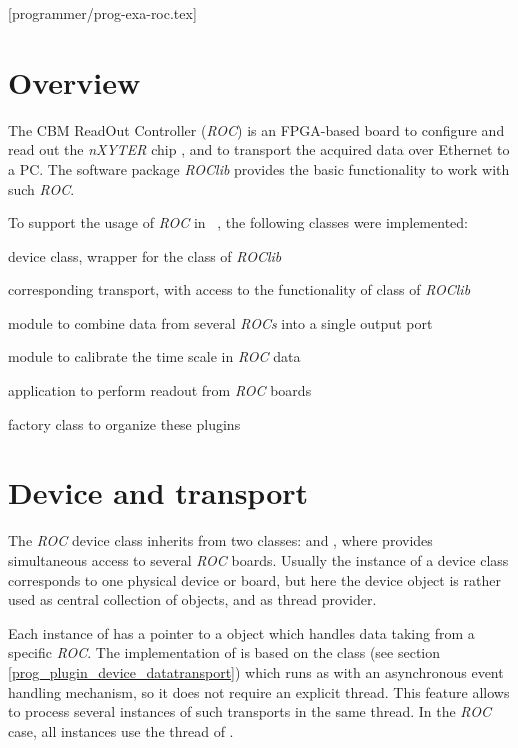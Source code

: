 [programmer/prog-exa-roc.tex]

\section{Overview}
\label{prog-exa-roc}
The CBM ReadOut Controller ({\em ROC}) is an FPGA-based board
to configure and read out the
{\em nXYTER} chip \cite{nxyter}, and to transport the acquired data over Ethernet to a PC. 
The software package {\em ROClib} 
provides the basic functionality to work with such {\em ROC}.
 
To support the usage of {\em ROC} in \dabc~, the following classes 
were implemented:
\bbul
\item {}  device class, wrapper for the 
class of {\em ROClib} 
\item {}  corresponding transport, with access to the functionality of  class of {\em ROClib} 
\item {}  module to combine data from several {\em ROCs} into a single output port 
\item {}  module to calibrate the time scale in {\em ROC} data  
\item {}  application to perform readout from {\em ROC} boards   
\item {}  factory class to organize these plugins 
\ebul


\section{Device and transport}

The {\em ROC} device class  inherits from two classes:  and ,
where  provides simultaneous access to several {\em ROC} boards. 
Usually the instance of a device class corresponds to one physical device or board, 
but here the device object is rather used as central collection of  objects, and as thread provider.

Each instance of  has a pointer to a  object
which handles data taking from a specific {\em ROC}. 
The implementation of  is based on the  class (see section \ref{prog_plugin_device_datatransport}) which
runs as  with an asynchronous event handling mechanism,
so it does not require an explicit thread.
This feature allows to process several instances of such transports in the same thread.
In the {\em ROC} case, all  instances use the thread of .   
  
